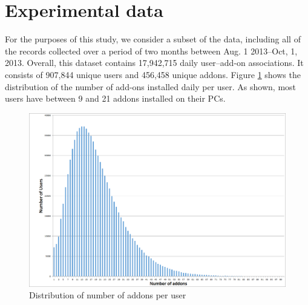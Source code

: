 \documentclass[11pt,oneside]{book}
\let\Oldsection\section
\renewcommand{\section}{\FloatBarrier\Oldsection}
\begin{document}
\section{Experimental data}

For the purposes of this study, we consider a subset of the data, including all of the records collected over a  period of two months between Aug. 1 2013--Oct, 1, 2013. Overall, this dataset contains 17,942,715 daily user--add-on associations. It consists of 907,844 unique users and 456,458 unique addons. Figure \ref{fig:user_addons_histogram} shows the distribution of the number of add-ons installed daily per user. As shown,  most users have between 9 and 21 addons installed on their PCs.

\begin{figure}[!htbp]
\centering
\includegraphics[width=\linewidth]{figures/user_addons_histogram.png}
\caption{Distribution of number of addons per user}
\label{fig:user_addons_histogram}
\end{figure}
\end{document}
